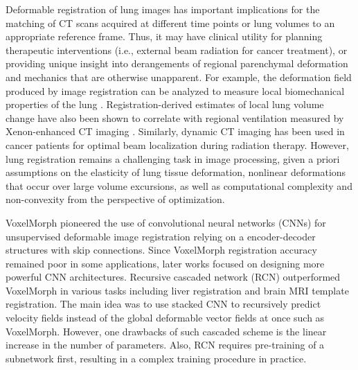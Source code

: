 \documentclass[runningheads]{llncs}
\begin{document}
Deformable registration of lung images has important implications for the matching of CT scans acquired at different time points or lung volumes to an appropriate reference frame.  Thus, it may have clinical utility for planning therapeutic interventions (i.e., external beam radiation for cancer treatment), or providing unique insight into derangements of regional parenchymal deformation and mechanics that are otherwise unapparent.  For example, the deformation field produced by image registration can be analyzed to measure local biomechanical properties of the lung \cite{amelonThreedimensionalCharacterizationRegional2011,bodduluriBiomechanicalCTMetrics2017,kaczkaAnalysisRegionalMechanics2011}. Registration-derived estimates of local lung volume change have also been shown to correlate with regional ventilation measured by Xenon-enhanced CT imaging \cite{reinhardtRegistrationbasedEstimatesLocal2008}.  Similarly, dynamic CT imaging has been used in cancer patients for optimal beam localization during radiation therapy. However, lung registration remains a challenging task in image processing, given a priori assumptions on the elasticity of lung tissue deformation, nonlinear deformations that occur over large volume excursions, as well as computational complexity and non-convexity from the perspective of optimization. 

VoxelMorph \cite{balakrishnanVoxelMorphLearningFramework2019} pioneered the use of convolutional neural networks (CNNs) for unsupervised deformable image registration relying on a encoder-decoder structures with skip connections. Since VoxelMorph registration accuracy remained poor in some applications, later works focused on designing more powerful CNN architectures. Recursive cascaded network (RCN) \cite{zhaoRecursiveCascadedNetworks2019} outperformed VoxelMorph in various tasks including liver registration and brain MRI template registration. The main idea was to use stacked CNN to recursively predict velocity fields instead of the global deformable vector fields at once such as VoxelMorph. However, one drawbacks of such cascaded scheme is the linear increase in the number of parameters. Also, RCN requires pre-training of a subnetwork first, resulting in a complex training procedure in practice.
\end{document}
